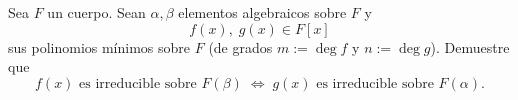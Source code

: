 Sea $F$ un cuerpo. Sean $\alpha,\beta$ elementos algebraicos sobre $F$ y
\[f(x),\;g(x)\in F[x]\]
sus polinomios mínimos sobre $F$ (de grados $m:=\deg f$ y $n:=\deg g$).
Demuestre que
\[
\boxed{\;
  f(x)\text{ es irreducible sobre }F(\beta)
  \;\Longleftrightarrow\;
  g(x)\text{ es irreducible sobre }F(\alpha).
\;}
\]
